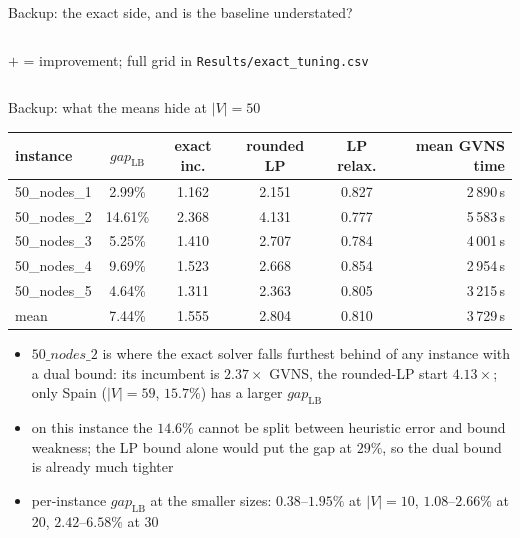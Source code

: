 \documentclass[aspectratio=169,10pt]{beamer}
\newcommand{\gapLB}{gap_{\mathrm{LB}}}
\begin{document}
\begin{frame}{Backup: the exact side, and is the baseline understated?}
\begin{columns}[T]
{\scriptsize $+$ = improvement; full grid in \texttt{Results/exact\_tuning.csv}\par}
\end{columns}
\end{frame}

\begin{frame}{Backup: what the means hide at $|V|=50$}
\centering
\small
\setlength{\tabcolsep}{6pt}
\begin{tabular}{@{}lccccr@{}}
\toprule
instance & $\gapLB$ & exact inc. & rounded LP & LP relax. & mean GVNS time\\
\midrule
50\_nodes\_1 & 2.99\% & 1.162 & 2.151 & 0.827 & 2\,890\,s\\
50\_nodes\_2 & \alert{14.61\%} & \alert{2.368} & 4.131 & 0.777 & 5\,583\,s\\
50\_nodes\_3 & 5.25\% & 1.410 & 2.707 & 0.784 & 4\,001\,s\\
50\_nodes\_4 & 9.69\% & 1.523 & 2.668 & 0.854 & 2\,954\,s\\
50\_nodes\_5 & 4.64\% & 1.311 & 2.363 & 0.805 & 3\,215\,s\\
\midrule
mean & 7.44\% & 1.555 & 2.804 & 0.810 & 3\,729\,s\\
\bottomrule
\end{tabular}

\medskip
\begin{itemize}
\item $50\_nodes\_2$ is where the exact solver falls furthest behind of any instance with a dual bound: its incumbent is $2.37\times$ GVNS, the rounded-LP start $4.13\times$; only Spain ($|V|=59$, $15.7\%$) has a larger $\gapLB$
\item on this instance the $14.6\%$ cannot be split between heuristic error and bound weakness; the LP bound alone would put the gap at $29\%$, so the dual bound is already much tighter
\item per-instance $\gapLB$ at the smaller sizes: $0.38$--$1.95\%$ at $|V|=10$, $1.08$--$2.66\%$ at 20, $2.42$--$6.58\%$ at 30
\end{itemize}
\end{frame}
\end{document}
